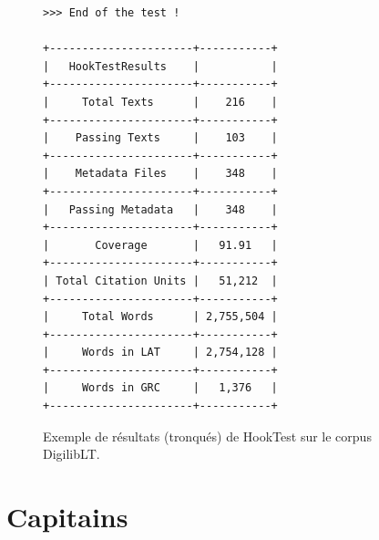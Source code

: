 \begin{figure}
\begin{adjustbox}{width=.9\linewidth}
\begin{lstlisting}[breaklines=false,columns=fullflexible,keepspaces]
>>> End of the test !

+----------------------+-----------+
|   HookTestResults    |           |
+----------------------+-----------+
|     Total Texts      |    216    |
+----------------------+-----------+
|    Passing Texts     |    103    |
+----------------------+-----------+
|    Metadata Files    |    348    |
+----------------------+-----------+
|   Passing Metadata   |    348    |
+----------------------+-----------+
|       Coverage       |   91.91   |
+----------------------+-----------+
| Total Citation Units |   51,212  |
+----------------------+-----------+
|     Total Words      | 2,755,504 |
+----------------------+-----------+
|     Words in LAT     | 2,754,128 |
+----------------------+-----------+
|     Words in GRC     |   1,376   |
+----------------------+-----------+
\end{lstlisting}
\end{adjustbox}
\caption{Exemple de résultats (tronqués) de HookTest sur le corpus DigilibLT.}
\label{fig:annx:digiliblt-hooktest}
\end{figure}

\section*{Capitains}

